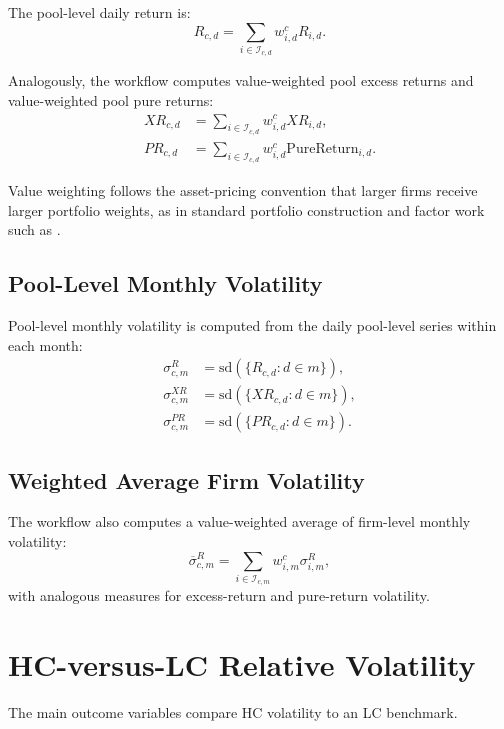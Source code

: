 \documentclass[11pt]{article}
\begin{document}
The pool-level daily return is:
\begin{equation}
R_{c,d}
=
\sum_{i \in \mathcal{I}_{c,d}}
w_{i,d}^{c} R_{i,d}.
\end{equation}

Analogously, the workflow computes value-weighted pool excess returns and
value-weighted pool pure returns:
\begin{align}
XR_{c,d}
&=
\sum_{i \in \mathcal{I}_{c,d}} w_{i,d}^{c} XR_{i,d},\\
PR_{c,d}
&=
\sum_{i \in \mathcal{I}_{c,d}} w_{i,d}^{c} \mathrm{PureReturn}_{i,d}.
\end{align}

Value weighting follows the asset-pricing convention that larger firms receive
larger portfolio weights, as in standard portfolio construction and factor
work such as \citet{famafrench1993}.

\subsection{Pool-Level Monthly Volatility}

Pool-level monthly volatility is computed from the daily pool-level series
within each month:
\begin{align}
\sigma^R_{c,m}
&=
\mathrm{sd}\left(\{R_{c,d}: d \in m\}\right),\\
\sigma^{XR}_{c,m}
&=
\mathrm{sd}\left(\{XR_{c,d}: d \in m\}\right),\\
\sigma^{PR}_{c,m}
&=
\mathrm{sd}\left(\{PR_{c,d}: d \in m\}\right).
\end{align}

\subsection{Weighted Average Firm Volatility}

The workflow also computes a value-weighted average of firm-level monthly
volatility:
\begin{equation}
\overline{\sigma}^{R}_{c,m}
=
\sum_{i \in \mathcal{I}_{c,m}}
w_{i,m}^{c}\sigma^R_{i,m},
\end{equation}
with analogous measures for excess-return and pure-return volatility.

\section{HC-versus-LC Relative Volatility}

The main outcome variables compare HC volatility to an LC benchmark.
\end{document}
